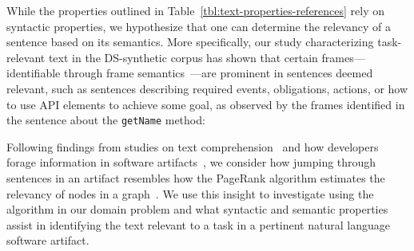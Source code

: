 



While the properties outlined in Table~\ref{tbl:text-properties-references} rely on 
syntactic properties, we hypothesize that one can determine the relevancy of a sentence based on its semantics. 
More specifically, our study characterizing task-relevant text in the
 \acs{DS-synthetic} corpus has shown that certain frames---identifiable through frame semantics~\cite{fillmore1976frame}---are prominent 
in sentences deemed relevant, such as sentences describing required events, obligations, actions, or how to use API elements to achieve some goal, as observed by the frames identified 
in the sentence about the \texttt{getName} method:






Following findings from studies on text comprehension~\cite{Kintsch1978a, Bystrom1995} and how developers forage information in software
artifacts~\cite{Fritz2014, Brandt2009a, DeGraaf2014},
we consider how jumping through sentences in an artifact 
resembles how the PageRank algorithm 
estimates the relevancy of nodes in a graph~\cite{Page1999, Lotufo2012}.
We use this insight to investigate using the algorithm in our domain problem and what syntactic and semantic properties assist in identifying the text relevant to a task in a pertinent natural language software artifact.



